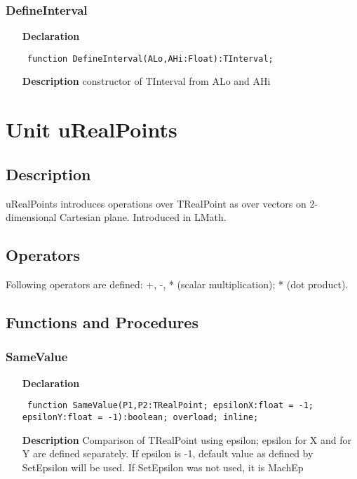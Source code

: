 \documentclass[12pt,a4paper,oneside]{report}
\newcommand{\lmath}[1]{   %
	\marginpar{\vspace{#1} 
		\begin{flushright}
			LMath
	\end{flushright} }
}
\newcommand{\declarationitem}[1]{\textbf{#1}}
\newcommand{\descriptiontitle}[1]{\textbf{#1}}
\newcommand{\code}[1]{\texttt{#1}}
\begin{document}
\subsubsection{DefineInterval}
\label{uIntervals-DefineInterval}
\begin{itemize}\item[\declarationitem{Declaration}\hfill]
\begin{flushleft}
\code{
function DefineInterval(ALo,AHi:Float):TInterval;}

\end{flushleft}

\par
\item[\descriptiontitle{Description}]
constructor of TInterval from ALo and AHi

\end{itemize}


\section{Unit uRealPoints}\lmath{-24pt}
\label{uRealPoints}
\subsection{Description}
uRealPoints introduces operations over TRealPoint as over vectors on 2-dimensional Cartesian plane. Introduced in LMath.
\subsection{Operators} 
Following operators are defined:
+, -, * (scalar multiplication); * (dot product). 
\subsection{Functions and Procedures}
\subsubsection{SameValue}
\label{uRealPoints-SameValue}
\begin{itemize}\item[\declarationitem{Declaration}\hfill]
\begin{flushleft}
\code{
function SameValue(P1,P2:TRealPoint; epsilonX:float = -1; epsilonY:float = -1):boolean; overload; inline;}

\end{flushleft}

\par
\item[\descriptiontitle{Description}]
Comparison of TRealPoint using epsilon; epsilon for X and for Y are defined separately. If epsilon is {-}1, default value as defined by SetEpsilon will be used. If SetEpsilon was not used, it is MachEp

\end{itemize}
\end{document}
